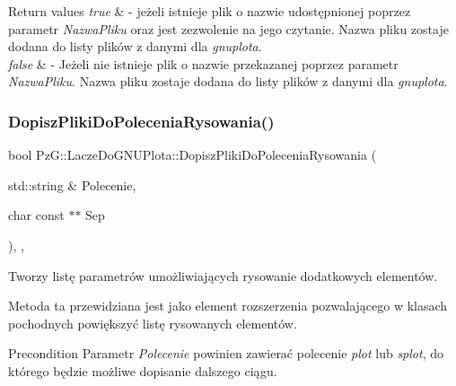 \begin{DoxyRetVals}{Return values}
{\em true} & -\/ jeżeli istnieje plik o nazwie udostępnionej poprzez parametr {\itshape Nazwa\+Pliku} oraz jest zezwolenie na jego czytanie. Nazwa pliku zostaje dodana do listy plików z danymi dla {\itshape gnuplota}. \\
\hline
{\em false} & -\/ Jeżeli nie istnieje plik o nazwie przekazanej poprzez parametr {\itshape Nazwa\+Pliku}. Nazwa pliku zostaje dodana do listy plików z danymi dla {\itshape gnuplota}. \\
\hline
\end{DoxyRetVals}
\mbox{\label{classPzG_1_1LaczeDoGNUPlota_a25585ec3f1bd3b6bf42f374c38b8d237}} 
\subsubsection{\texorpdfstring{Dopisz\+Pliki\+Do\+Polecenia\+Rysowania()}{DopiszPlikiDoPoleceniaRysowania()}}
{\footnotesize\ttfamily bool Pz\+G\+::\+Lacze\+Do\+G\+N\+U\+Plota\+::\+Dopisz\+Pliki\+Do\+Polecenia\+Rysowania (\begin{DoxyParamCaption}\item[{std\+::string \&}]{Polecenie,  }\item[{char const $\ast$$\ast$}]{Sep }\end{DoxyParamCaption})\hspace{0.3cm}{\ttfamily [inline]}, {\ttfamily [protected]}, {\ttfamily [virtual]}}



Tworzy listę parametrów umożliwiających rysowanie dodatkowych elementów. 

Metoda ta przewidziana jest jako element rozszerzenia pozwalającego w klasach pochodnych powiększyć listę rysowanych elementów. \begin{DoxyPrecond}{Precondition}
Parametr {\itshape Polecenie} powinien zawierać polecenie {\itshape plot} lub {\itshape splot}, do którego będzie możliwe dopisanie dalszego ciągu. 
\end{DoxyPrecond}

